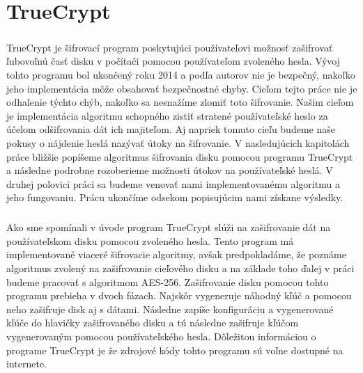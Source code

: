 \chapter{TrueCrypt}
\paragraph{}
TrueCrypt je šifrovací program poskytujúci používateľovi možnosť zašifrovať ľubovoľnú časť  disku v počítači pomocou používateľom zvoleného hesla. Vývoj tohto programu bol ukončený roku 2014 a podľa autorov nie je bezpečný, nakoľko jeho implementácia môže obsahovať bezpečnostné chyby. Cieľom tejto práce nie je odhalenie týchto chýb, nakoľko sa nesnažíme zlomiť toto šifrovanie. Našim cieľom je implementácia algoritmu schopného zistiť stratené používateľské heslo za účelom odšifrovania dát ich majiteľom. Aj napriek tomuto cieľu budeme naše pokusy o nájdenie heslá nazývať útoky na šifrovanie. V nasledujúcich kapitolách práce bližšie popíšeme algoritmus šifrovania disku pomocou programu TrueCrypt a následne podrobne rozoberieme možnosti útokov na používateľské heslá. V druhej polovici práci sa budeme venovať nami implementovanému algoritmu a jeho fungovaniu. Prácu ukončíme odsekom popisujúcim nami získane výsledky.
\paragraph{}
Ako sme spomínali v úvode program TrueCrypt slúži na zašifrovanie dát na používateľskom disku pomocou zvoleného hesla. Tento program má implementované viaceré šifrovacie algoritmy, avšak predpokladáme, že poznáme algoritmus zvolený na zašifrovanie cieľového disku a na základe toho ďalej v práci budeme pracovať s algoritmom AES-256. Zašifrovanie disku pomocou tohto programu prebieha v dvoch fázach. Najskôr vygeneruje náhodný kľúč a pomocou neho zašifruje disk aj s dátami. Následne zapíše konfiguráciu a vygenerované kľúče do hlavičky zašifrovaného disku a tú následne zašifruje kľúčom vygenerovaným pomocou používateľského hesla. Dôležitou informáciou o programe TrueCrypt je že zdrojové kódy tohto programu sú voľne dostupné na internete.
